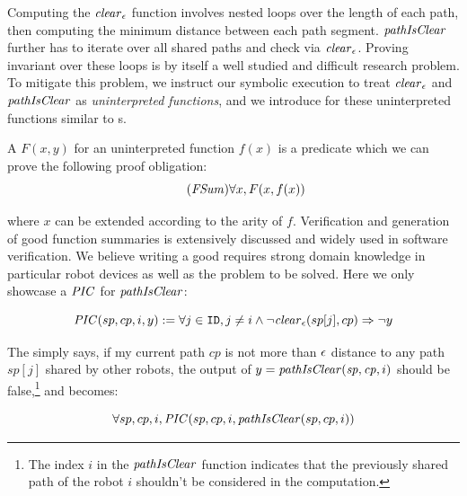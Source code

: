 Computing the $\mathit{clear}_\epsilon$ function involves nested loops over the length of each path,
then computing the minimum distance between each path segment.
$\mathit{pathIsClear}$ further has to iterate over all shared paths and check via $\mathit{clear}_\epsilon$.
Proving invariant over these loops is by itself a well studied and difficult research problem.
To mitigate this problem,
we instruct our symbolic execution to treat $\mathit{clear}_\epsilon$ and $\mathit{pathIsClear}$ as \emph{uninterpreted functions},
and we introduce \emph{\funcasum} for these uninterpreted functions similar to \portasum{}s.
\begin{definition}
    A \emph{\funcasum} $F(x, y)$ for an uninterpreted function $f(x)$ is a predicate which
    we can prove the following proof obligation:
    \begin{equation}\label{po:func-sum}\tag{\textit{FSum}}
    \forall x, F(x, f(x))
    \end{equation}
\end{definition}
\noindent
where $x$ can be extended according to the arity of $f$.
Verification and generation of good function summaries is extensively discussed and widely used
in software verification.
We believe writing a good \funcasum{} requires strong domain knowledge in particular robot devices as well as the problem to be solved.
Here we only showcase a \funcasum $\mathit{PIC}$ for $\mathit{pathIsClear}$:
\begin{summary}
\small
\[
\mathit{PIC}(sp, cp, i, y) := \forall j \in \texttt{ID}, j\neq i \land \neg\mathit{clear}_\epsilon(sp[j], cp) \Rightarrow \neg y
\]
\end{summary}\noindent
The \funcasum simply says, if my current path $cp$ is not more than $\epsilon$ distance to any path $sp[j]$ shared by other robots,
the output of $y = \mathit{pathIsClear}(\mathit{sp}, \mathit{cp}, i)$ should be false,\footnote{%
The index $i$ in the $\mathit{pathIsClear}$ function indicates that the previously shared path of the robot $i$ shouldn't be considered in the computation.}
and  becomes:
\begin{proofob}
    \label{po:pathclear}
    $$\forall sp, cp, i, \mathit{PIC}(sp, cp, i, \mathit{pathIsClear}(sp,cp, i))$$
\end{proofob}


